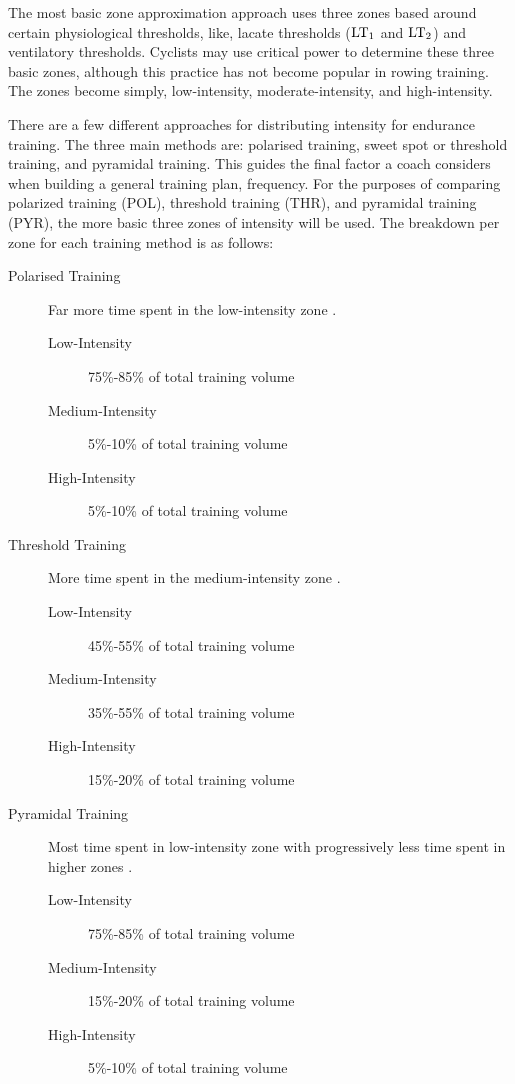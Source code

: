 The most basic zone approximation approach uses three zones based around certain physiological thresholds, like, lacate thresholds ($\textnormal{LT}_\text{1}$ and $\textnormal{LT}_\text{2}$) and ventilatory thresholds. Cyclists may use critical power to determine these three basic zones, although this practice has not become popular in rowing training. The zones become simply, low-intensity, moderate-intensity, and high-intensity. 

There are a few different approaches for distributing intensity for endurance training. The three main methods are: polarised training, sweet spot or threshold training, and pyramidal training. This guides the final factor a coach considers when building a general training plan, frequency. For the purposes of comparing polarized training (POL), threshold training (THR), and pyramidal training (PYR), the more basic three zones of intensity will be used. The breakdown per zone for each training method is as follows:
\begin{description}
  \item[Polarised Training] Far more time spent in the low-intensity zone \autocite{Seiler2004}.

  \begin{description}
    \item[Low-Intensity] 75\%-85\% of total training volume
    \item[Medium-Intensity] 5\%-10\% of total training volume
    \item[High-Intensity] 5\%-10\% of total training volume  
  \end{description} 
  \item[Threshold Training] More time spent in the medium-intensity zone \autocite{Seiler2004}.

  \begin{description}
    \item[Low-Intensity] 45\%-55\% of total training volume
    \item[Medium-Intensity] 35\%-55\% of total training volume
    \item[High-Intensity] 15\%-20\% of total training volume  
  \end{description}
  \item[Pyramidal Training] Most time spent in low-intensity zone with progressively less time spent in higher zones \autocite{Selles2019}.

  \begin{description}
    \item[Low-Intensity] 75\%-85\% of total training volume
    \item[Medium-Intensity] 15\%-20\% of total training volume
    \item[High-Intensity] 5\%-10\% of total training volume  
  \end{description}
\end{description}

